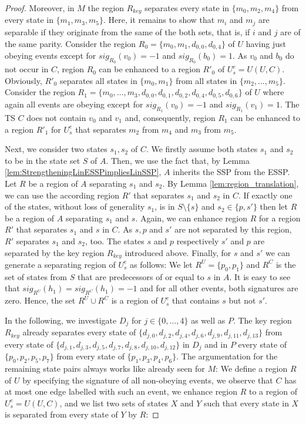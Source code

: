 \documentclass[english]{lipics_hacked}
\begin{document}
\begin{proof}
Moreover, in $M$ the region $R_{key}$ separates every state in $\{m_0,m_2,m_4\}$ from every state in $\{m_1,m_3,m_5\}$.
Here, it remains to show that $ m_i$ and $ m_j$ are separable if they originate from the same of the both sets, that is, if $i$ and $j$ are of the same parity.
Consider the region $R_0 = \{m_0,m_1,d_{0,0},d_{0,4}\}$ of $U$ having just obeying events except for $sig_{R_0}(v_0) = -1$ and $sig_{R_0}(b_0) = 1$.
As $v_0$ and $b_0$ do not occur in $C$, region $R_0$ can be enhanced to a region $R'_0$ of $U^e_s = U(U, C)$.
Obviously, $R'_0$ separates all states in $\{m_0, m_1\}$ from all states in $\{m_2, \dots, m_5\}$.
Consider the region $R_1 = \{m_0, \dots, m_3, d_{0,0}, d_{0,1}, d_{0,2}, d_{0,4}, d_{0,5}, d_{0,6}\}$ of $U$ where again all events are obeying except for $sig_{R_1}(v_0) = -1$ and $sig_{R_1}(v_1) = 1$.
The TS $C$ does not contain $v_0$ and $v_1$ and, consequently, region $R_1$ can be enhanced to a region $R'_1$ for $U^e_s$ that separates $m_2$ from $m_4$ and $m_3$ from $m_5$.

Next, we consider two states $s_1,s_2$ of $C$.
We firstly assume both states $s_1$ and $s_2$ to be in the state set $S$ of $A$.
Then, we use the fact that, by Lemma \ref{lem:StrengtheningLinESSPimpliesLinSSP}, $A$ inherits the SSP from the ESSP.
Let $R$ be a region of $A$ separating $s_1$ and $s_2$.
By Lemma \ref{lem:region_translation}, we can use the according region $R'$ that separates $s_1$ and $s_2$ in $C$.
If exactly one of the states, without loss of generality $s_1$, is in $S\setminus \{s\}$ and $s_2\in \{p,s'\}$ then let $R$ be a region of $A$ separating $s_1$ and $s$.
Again, we can enhance region $R$ for a region $R'$ that separates $s_1$ and $s$ in $C$.
As $s, p$ and $s'$ are not separated by this region, $R'$ separates $s_1$ and $s_2$, too.
The states $s$ and $p$ respectively $s'$ and $p$ are separated by the key region $R_{key}$ introduced above.
Finally, for $s$ and $s'$ we can generate a separating region of $U^e_s$ as follows:
We let $R^U = \{p_0, p_1\}$ and $R^C$ is the set of states from $S$ that are predecessors of or equal to $s$ in $A$.
It is easy to see that $sig_{R^U}(h_1) = sig_{R^C}(h_1) = -1$ and for all other events, both signatures are zero.
Hence, the set $R^U \cup R^C$ is a region of $U^e_s$ that contains $s$ but not $s'$.

In the following, we investigate $D_j$ for $j \in \{0, \dots, 4\}$ as well as $P$.
The key region $R_{key}$ already separates every state of $\{d_{j,0}, d_{j,2}, d_{j,4}, d_{j,6}, d_{j,9}, d_{j,11}, d_{j,13}\}$ from every state of $\{d_{j,1}, d_{j,3}, d_{j,5}, d_{j,7}, d_{j,8}, d_{j,10}, d_{j,12}\}$ in $D_j$ and in $P$ every state of $\{p_0, p_2, p_5, p_7\}$ from every state of $\{p_1, p_3, p_4, p_6\}$.
The argumentation for the remaining state pairs always works like already seen for $M$:
We define a region $R$ of $U$ by specifying the signature of all non-obeying events, we observe that $C$ has at most one edge labelled with such an event, we enhance region $R$ to a region of $U^e_s = U(U, C)$, and we list two sets of states $X$ and $Y$ such that every state in $X$ is separated from every state of $Y$ by $R$:


\end{proof}
\end{document}
